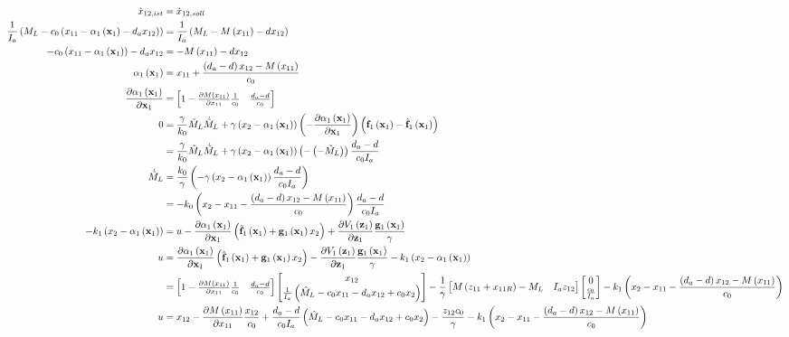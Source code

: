\documentclass[10pt,a3paper,landscape]{article}
\begin{document}
\begin{align}
	\dot{x}_{12,ist}&=\dot{x}_{12,soll}\\
	\frac{1}{I_a}\mybr{M_L-c_0\mybr{x_{11}-\alphae-d_a x_{12}}}&=\frac{1}{I_a}\mybr{M_L-M\mybr{x_{11}}-d x_{12}}\\
	-c_0\mybr{x_{11}-\alphae}-d_a x_{12}&=-M\mybr{x_{11}}-d x_{12}\\
	\alphae&=x_{11}+\frac{\mybr{d_a-d}x_{12}-M\mybr{x_{11}}}{c_0}\\
	\dadxe&=\begin{bmatrix}1-\frac{\partial M\mybr{x_{11}}}{\partial x_{11}} \frac{1}{c_0} & \frac{d_a-d}{c_0}\end{bmatrix}\\
	0&=\frac{\gamma}{k_0}\mls\mlsp+\gamma\mybr{x_2-\alphae}\mybr{-\dadxe}\mybr{\fe-\fed}\\
	&=\frac{\gamma}{k_0}\mls\mlsp+\gamma\mybr{x_2-\alphae}\mybr{-\mybr{-\mls}}\frac{d_a-d}{c_0I_a}\\
	\mlsp&=\frac{k_0}{\gamma}\mybr{-\gamma\mybr{x_2-\alphae}\frac{d_a-d}{c_0 I_a}}\\
	&=-k_0\mybr{x_2-x_{11}-\frac{\mybr{d_a-d}x_{12}-M\mybr{x_{11}}}{c_0}}\frac{d_a-d}{c_0 I_a}\\
	-k_1\mybr{x_2-\alphae}&=u-\dadxe\mybr{\fed+\ge x_2}+\dVedze \frac{\ge}{\gamma}\\
	u&=\dadxe\mybr{\fed+\ge x_2}-\dVedze \frac{\ge}{\gamma}-k_1\mybr{x_2-\alphae}\\
	&=\begin{bmatrix}1-\frac{\partial M\mybr{x_{11}}}{\partial x_{11}} \frac{1}{c_0} & \frac{d_a-d}{c_0}\end{bmatrix}\begin{bmatrix}x_{12}\\
	\frac{1}{I_a}\mybr{\mld-c_0x_{11}-d_a x_{12}+c_0x_2}
	\end{bmatrix}-\frac{1}{\gamma}\begin{bmatrix}M\mybr{z_{11}+x_{11R}}-M_L & I_a z_{12}\end{bmatrix}\begin{bmatrix}
	0\\\frac{c_0}{I_a}
	\end{bmatrix}-k_1\mybr{x_2-x_{11}-\frac{\mybr{d_a-d}x_{12}-M\mybr{x_{11}}}{c_0}}\\
	u&=x_{12}-\frac{\partial M\mybr{x_{11}}}{\partial x_{11}}\frac{x_{12}}{c_0}+\frac{d_a-d}{c_0 I_a}\mybr{\mld-c_0 x_{11}-d_a x_{12}+c_0 x_2}-\frac{z_{12} c_0}{\gamma}-k_1\mybr{x_2-x_{11}-\frac{\mybr{d_a-d}x_{12}-M\mybr{x_{11}}}{c_0}}
\end{align}
\end{document}
